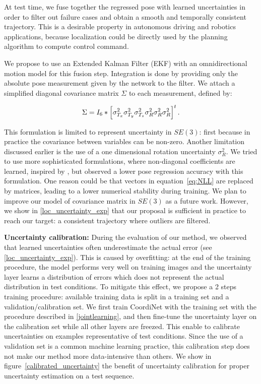 \documentclass[10pt,twocolumn,letterpaper]{article}
\begin{document}
At test time, we fuse together the regressed pose with learned uncertainties in order to filter out failure cases and obtain a smooth and temporally consistent trajectory. This is a desirable property in autonomous driving and robotics applications, because localization could be directly used by the planning algorithm to compute control command.

We propose to use an Extended Kalman Filter (EKF) with an omnidirectional motion model for this fusion step. Integration is done by providing only the absolute pose measurement given by the network to the filter. We attach a simplified diagonal covariance matrix $\Sigma$ to each measurement, defined by:

$$
\Sigma = I_{6} * 
\left[
\sigma^2_{T_{x}} 
\sigma^2_{T_{y}} 
\sigma^2_{T_{z}} 
\sigma^2_{R} 
\sigma^2_{R} 
\sigma^2_{R} \\ 
\right]^t.
$$

This formulation is limited to represent uncertainty in $SE(3)$: first because in practice the covariance between variables can be non-zero. Another limitation discussed earlier is the use of a one dimensional rotation uncertainty $\sigma^2_{R}$.
We tried to use more sophisticated formulations, where non-diagonal coefficients are learned, inspired by \cite{multivariate,peretroukhin2019probabilistic}, but observed a lower pose regression accuracy with this formulation. One reason could be that vectors in equation~\ref{eq:NLL} are replaced by matrices, leading to a lower numerical stability during training. We plan to improve our model of covariance matrix in $SE(3)$ as a future work. However, we show in \ref{loc_uncertainty_exp} that our proposal is sufficient in practice to reach our target: a consistent trajectory where outliers are filtered.

\label{subsec:calibrated_covariance}
\textbf{Uncertainty calibration:} During the evaluation of our method, we observed that learned uncertainties often underestimate the actual error (see \ref{loc_uncertainty_exp}). This is caused by overfitting: at the end of the training procedure, the model performs very well on training images and the uncertainty layer learns a distribution of errors which does not represent the actual distribution in test conditions. To mitigate this effect, we propose a 2 steps training procedure: available training data is split in a training set and a validation/calibration set. We first train CoordiNet with the training set with the procedure described in \ref{jointlearning}, and then fine-tune the uncertainty layer on the calibration set while all other layers are freezed. This enable to calibrate uncertainties on examples representative of test conditions. Since the use of a validation set is a common machine learning practice, this calibration step does not make our method more data-intensive than others. We show in figure~\ref{calibrated_uncertainty} the benefit of uncertainty calibration for proper uncertainty estimation on a test sequence.
\end{document}
